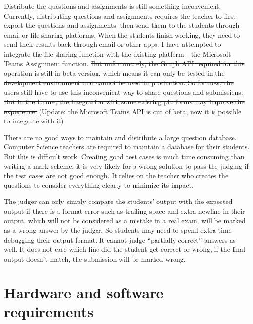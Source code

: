 \documentclass[a4paper]{report}
\begin{document}
Distribute the questions and assignments is still something inconvenient. Currently, distributing questions and assignments requires the teacher to first export the questions and assignments, then send them to the students through email or file-sharing platforms. When the students finish working, they need to send their results back through email or other apps. I have attempted to integrate the file-sharing function with the existing platform - the Microsoft Teams Assignment function. \sout{But unfortunately, the Graph API required for this operation is still in beta version, which means it can only be tested in the development environment and cannot be used in production. So for now, the users still have to use this inconvenient way to share questions and submissions. But in the future, the integration with some existing platforms may improve the experience.} (Update: the Microsoft Teams API is out of beta, now it is possible to integrate with it)

There are no good ways to maintain and distribute a large question database. Computer Science teachers are required to maintain a database for their students. But this is difficult work. Creating good test cases is much time consuming than writing a mark scheme, it is very likely for a wrong solution to pass the judging if the test cases are not good enough. It relies on the teacher who creates the questions to consider everything clearly to minimize its impact.

The judger can only simply compare the students' output with the expected output if there is a format error such as trailing space and extra newline in their output, which will not be considered as a mistake in a real exam, will be marked as a wrong answer by the judger. So students may need to spend extra time debugging their output format. It cannot judge ``partially correct'' answers as well. It does not care which line did the student get correct or wrong, if the final output doesn't match, the submission will be marked wrong.

\section{Hardware and software requirements}
\end{document}
